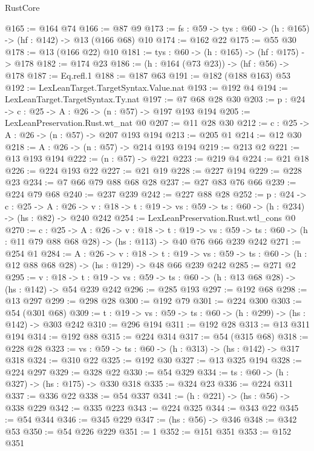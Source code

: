\begin{lexlean}{RustCore}
\begin{coremodule}
@165 := @164 @74
@166 := @87 @9
@173 := {fs : @59} -> {tys : @60} -> (h : @165) -> (hf : @142) -> @13 (@166 @68) @10
@174 := @162 @22
@175 := @55 @30
@178 := @13 (@166 @22) @10
@181 := {tys : @60} -> (h : @165) -> (hf : @175) -> @178
@182 := @174 @23
@186 := (h : @164 (@73 @23)) -> (hf : @56) -> @178
@187 := Eq.refl.{1}
@188 := @187 @63
@191 := @182 (@188 @163) @53
@192 := LexLeanTarget.TargetSyntax.Value.nat
@193 := @192 @4
@194 := LexLeanTarget.TargetSyntax.Ty.nat
@197 := @7 @68 @28 @30
@203 := {p : @24} -> {c : @25} -> {A : @26} -> (n : @57) -> @197 @193 @194
@205 := LexLeanPreservation.Rust.wt_nat @0
@207 := @11 @28 @30
@212 := {c : @25} -> {A : @26} -> (n : @57) -> @207 @193 @194
@213 := @205 @1
@214 := @12 @30
@218 := {A : @26} -> (n : @57) -> @214 @193 @194
@219 := @213 @2
@221 := @13 @193 @194
@222 := (n : @57) -> @221
@223 := @219 @4
@224 := @21 @18
@226 := @224 @193 @22
@227 := @21 @19
@228 := @227 @194
@229 := @228 @23
@234 := @7 @66 @79 @88 @68 @28
@237 := @27 @83 @76 @66
@239 := @224 @79 @68
@240 := @237 @239
@242 := @227 @88 @28
@252 := {p : @24} ->
  {c : @25} ->
  {A : @26} ->
  {v : @18} -> {t : @19} -> {vs : @59} -> {ts : @60} -> (h : @234) -> (hs : @82) -> @240 @242
@254 := LexLeanPreservation.Rust.wtl_cons @0
@270 := {c : @25} ->
  {A : @26} ->
  {v : @18} ->
  {t : @19} ->
  {vs : @59} -> {ts : @60} -> (h : @11 @79 @88 @68 @28) -> (hs : @113) -> @40 @76 @66 @239 @242
@271 := @254 @1
@284 := {A : @26} ->
  {v : @18} ->
  {t : @19} -> {vs : @59} -> {ts : @60} -> (h : @12 @88 @68 @28) -> (hs : @129) -> @48 @66 @239 @242
@285 := @271 @2
@295 := {v : @18} ->
  {t : @19} -> {vs : @59} -> {ts : @60} -> (h : @13 @68 @28) -> (hs : @142) -> @54 @239 @242
@296 := @285 @193
@297 := @192 @68
@298 := @13 @297
@299 := @298 @28
@300 := @192 @79
@301 := @224 @300
@303 := @54 (@301 @68)
@309 := {t : @19} -> {vs : @59} -> {ts : @60} -> (h : @299) -> (hs : @142) -> @303 @242
@310 := @296 @194
@311 := @192 @28
@313 := @13 @311 @194
@314 := @192 @88
@315 := @224 @314
@317 := @54 (@315 @68)
@318 := @228 @28
@323 := {vs : @59} -> {ts : @60} -> (h : @313) -> (hs : @142) -> @317 @318
@324 := @310 @22
@325 := @192 @30
@327 := @13 @325 @194
@328 := @224 @297
@329 := @328 @22
@330 := @54 @329
@334 := {ts : @60} -> (h : @327) -> (hs : @175) -> @330 @318
@335 := @324 @23
@336 := @224 @311
@337 := @336 @22
@338 := @54 @337
@341 := (h : @221) -> (hs : @56) -> @338 @229
@342 := @335 @223
@343 := @224 @325
@344 := @343 @22
@345 := @54 @344
@346 := @345 @229
@347 := (hs : @56) -> @346
@348 := @342 @53
@350 := @54 @226 @229
@351 := 1
@352 := @151 @351
@353 := @152 @351

\end{coremodule}
\end{lexlean}

